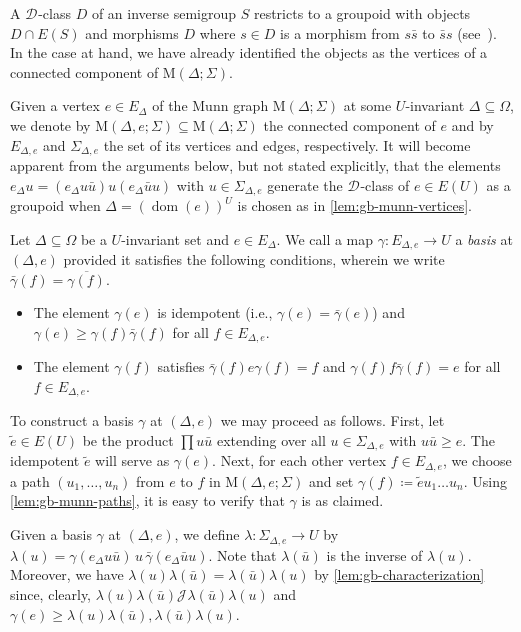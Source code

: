 \documentclass[anonymous,letter,UKenglish,cleveref,autoref,thm-restate]{lipics-v2021}
\renewcommand{\geq}{\geqslant}
\renewcommand{\ge}{\geq}
\newcommand{\sse}{\subseteq}
\newcommand{\dom}{\operatorname{dom}}
\newcommand*{\gD}[1][]{\mathrel{\mathcal{D}_{#1}}}
\newcommand*{\gJ}[1][]{\mathrel{\mathcal{J}_{#1}}}
\theoremstyle{plain}
\theoremstyle{plain}
\begin{document}
A $\gD$-class $D$ of an inverse semigroup $S$ restricts to a groupoid with objects $D \cap E(S)$ and morphisms $D$ where $s \in D$ is a morphism from $s \bar s$ to $\bar s s$ (see~\cite{CliffordMiller56}).
In the case at hand, we have already identified the objects as the vertices of a connected component of $\mathrm{M}(\Delta; \Sigma)$.

Given a vertex $e \in E_\Delta$ of the Munn graph $\mathrm{M}(\Delta; \Sigma)$ at some $U$-invariant $\Delta \sse \Omega$, we denote by $\mathrm{M}(\Delta, e; \Sigma) \sse \mathrm{M}(\Delta; \Sigma)$ the connected component of $e$ and by $E_{\Delta,e}$ and $\Sigma_{\Delta,e}$ the set of its vertices and edges, respectively.
It will become apparent from the arguments below, but not stated explicitly, that the elements $e_\Delta u = (e_\Delta u \bar u) u (e_\Delta \bar u u)$ with $u \in \Sigma_{\Delta,e}$ generate the $\gD$-class of $e \in E(U)$ as a groupoid when $\Delta = (\dom(e))^U$ is chosen as in \cref{lem:gb-munn-vertices}.

\begin{definition}
  Let $\Delta \sse \Omega$ be a $U$-invariant set and $e \in E_\Delta$.
  We call a map $\gamma \colon E_{\Delta, e} \to U$ a \emph{basis} at $(\Delta, e)$ provided it satisfies the following conditions, wherein we write $\bar\gamma(f) = \overline{\gamma(f)}$.
  \begin{itemize}
    \item The element $\gamma(e)$ is idempotent (i.e., $\gamma(e) = \bar\gamma(e)$) and $\gamma(e) \geq \gamma(f)\bar\gamma(f)$ for all $f \in E_{\Delta, e}$.
    \item The element $\gamma(f)$ satisfies $\bar\gamma(f) e \gamma(f) = f$ and $\gamma(f) f \bar\gamma(f) = e$ for all $f \in E_{\Delta, e}$.
  \end{itemize}
\end{definition}

To construct a basis $\gamma$ at $(\Delta, e)$ we may proceed as follows.
First, let $\tilde e \in E(U)$ be the product $\prod u \bar u$ extending over all $u \in \Sigma_{\Delta,e}$ with $u \bar u \ge e$.
The idempotent $\tilde e$ will serve as $\gamma(e)$.
Next, for each other vertex $f \in E_{\Delta, e}$, we choose a path $(u_1, \dotsc, u_n)$ from $e$ to $f$ in $\mathrm{M}(\Delta, e; \Sigma)$ and set $\gamma(f) \coloneqq \tilde e u_1 \dotsc u_n$.
Using \cref{lem:gb-munn-paths}, it is easy to verify that $\gamma$ is as claimed.

Given a basis $\gamma$ at $(\Delta, e)$, we define $\lambda\colon \Sigma_{\Delta,e} \to U$ by $\lambda(u) = \gamma(e_\Delta u \bar u) \, u \, \bar\gamma(e_\Delta \bar u u)$.
Note that $\lambda(\bar u)$ is the inverse of $\lambda(u)$.
Moreover, we have $\lambda(u)\lambda(\bar u) = \lambda(\bar u )\lambda(u)$ by \cref{lem:gb-characterization} since, clearly, $\lambda(u)\lambda(\bar u) \gJ \lambda(\bar u )\lambda(u)$ and $\gamma(e) \geq \lambda(u)\lambda(\bar u), \lambda(\bar u )\lambda(u)$.
\end{document}
